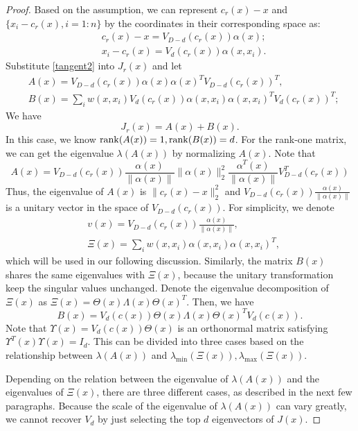 \documentclass[aos,preprint]{imsart}
\theoremstyle{remark}
\begin{document}
\begin{appendix}
\begin{proof}
Based on the assumption, we can represent $c_r(x)-x$ and $\{x_i-c_r(x), i=1:n\}$ by the coordinates in their corresponding space as:
\begin{equation} \label{tangent2}
\begin{aligned}
&c_r(x) - x =  V_{D-d}(c_r(x)) \alpha(x); \\
&x_i-c_r(x) = V_d(c_r(x))\alpha(x, x_i).
\end{aligned}
\end{equation}
Substitute \eqref{tangent2} into $J_r(x)$ and let
\begin{align*}
&A(x)= V_{D-d}(c_r(x)) \alpha(x) \alpha(x)^T V_{D-d}(c_r(x))^T,\\
&B(x)=\sum_i w(x, x_i) V_d(c_r(x)) \alpha(x, x_i)\alpha(x, x_i)^T V_d(c_r(x))^T ;
\end{align*}
We have
\[
J_r(x) =A(x) + B(x).
\]
In this case, we know ${\rm rank}(A(x))=1, {\rm rank} (B(x))=d$. For the rank-one matrix, we can get the eigenvalue  $\lambda(A(x))$ by normalizing $A(x)$. Note that
\[
A(x) = V_{D-d}(c_r(x))\frac{\alpha(x)}{\|\alpha(x)\|}  \|\alpha(x)\|_2^2 \frac{\alpha^T(x)}{\|\alpha(x)\|}  V^T_{D-d}(c_r(x))
\]
Thus, the eigenvalue of $A(x)$ is $\|c_r(x)-x\|_2^2$ and $V_{D-d}(c_r(x))\frac{\alpha(x)}{\|\alpha(x)\|}$ is a unitary vector in the space of $V_{D-d}(c_r(x))$. For simplicity, we denote 
\[
\begin{aligned}
&v(x) = V_{D-d}(c_r(x))\frac{\alpha(x)}{\|\alpha(x)\|},\\
&\Xi (x) = \sum_i w(x, x_i) \alpha(x, x_i)\alpha(x, x_i)^T,
\end{aligned}
\]
which will be used in our following discussion.
Similarly, the matrix $B(x)$ shares the same eigenvalues  with $\Xi (x)$, because the unitary transformation keep the singular values unchanged. 
Denote the eigenvalue decomposition of $\Xi (x)$ as  $\Xi(x) = \Theta(x) \Lambda(x) \Theta(x)^T$. Then, we have
\[
B(x) = V_d(c(x))\Theta(x) \Lambda(x)\Theta(x)^T V_d(c(x)).
\]
Note that $\Upsilon(x) = V_d(c(x))\Theta(x)$ is an orthonormal matrix satisfying 
$\Upsilon^T (x)\Upsilon(x)=I_d$. This can be divided into three cases based on the relationship between $\lambda(A(x))$ and $\lambda_{\min}(\Xi(x)), \lambda_{\max}(\Xi(x))$.

Depending on the relation between the eigenvalue of $\lambda(A(x))$ and the eigenvalues of $\Xi(x)$, there are three different cases, as described in the next few paragraphs. Because the scale of the eigenvalue of $\lambda(A(x))$ can vary greatly, we cannot recover $V_d$ by just selecting the top $d$ eigenvectors of $J(x)$.


\end{proof}
\end{appendix}
\end{document}
